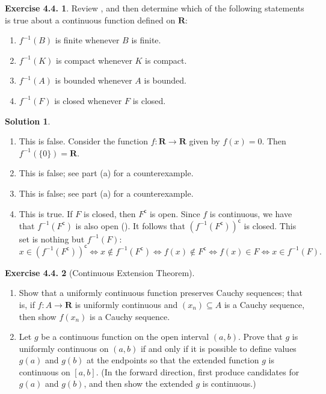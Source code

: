 \documentclass[12pt]{article}
\theoremstyle{definition}
\theoremstyle{exercise}
\newtheorem{exercise}{Exercise 4.4.}
\theoremstyle{solution}
\newtheorem*{solution}{Solution}
\newcommand{\setcomp}[1]{#1^{\mathsf{c}}}
\newcommand{\R}{\mathbf{R}}
\begin{document}
\begin{exercise}
\label{ex:12}
    Review , and then determine which of the following statements is true about a continuous function defined on \( \R \):
    \begin{enumerate}
        \item \( f^{-1}(B) \) is finite whenever \( B \) is finite.

        \item \( f^{-1}(K) \) is compact whenever \( K \) is compact.

        \item \( f^{-1}(A) \) is bounded whenever \( A \) is bounded.

        \item \( f^{-1}(F) \) is closed whenever \( F \) is closed.
    \end{enumerate}
\end{exercise}

\begin{solution}
    \begin{enumerate}
        \item This is false. Consider the function \( f : \R \to \R \) given by \( f(x) = 0 \). Then \( f^{-1}(\{ 0 \}) = \R \).

        \item This is false; see part (a) for a counterexample.

        \item This is false; see part (a) for a counterexample.

        \item This is true. If \( F \) is closed, then \( \setcomp{F} \) is open. Since \( f \) is continuous, we have that \( f^{-1}(\setcomp{F}) \) is also open (). It follows that \( \setcomp{(f^{-1}(\setcomp{F}))} \) is closed. This set is nothing but \( f^{-1}(F) \):
        \[
            x \in \setcomp{(f^{-1}(\setcomp{F}))} \iff x \not\in f^{-1}(\setcomp{F}) \iff f(x) \not\in \setcomp{F} \iff f(x) \in F \iff x \in f^{-1}(F).
        \]
    \end{enumerate}
\end{solution}

\begin{exercise}[Continuous Extension Theorem]
\label{ex:13}
    \begin{enumerate}
        \item Show that a uniformly continuous function preserves Cauchy sequences; that is, if \( f : A \to \R \) is uniformly continuous and \( (x_n) \subseteq A \) is a Cauchy sequence, then show \( f(x_n) \) is a Cauchy sequence.

        \item Let \( g \) be a continuous function on the open interval \( (a, b) \). Prove that \( g \) is uniformly continuous on \( (a, b) \) if and only if it is possible to define values \( g(a) \) and \( g(b) \) at the endpoints so that the extended function \( g \) is continuous on \( [a, b] \). (In the forward direction, first produce candidates for \( g(a) \) and \( g(b) \), and then show the extended \( g \) is continuous.)
    \end{enumerate}
\end{exercise}
\end{document}
